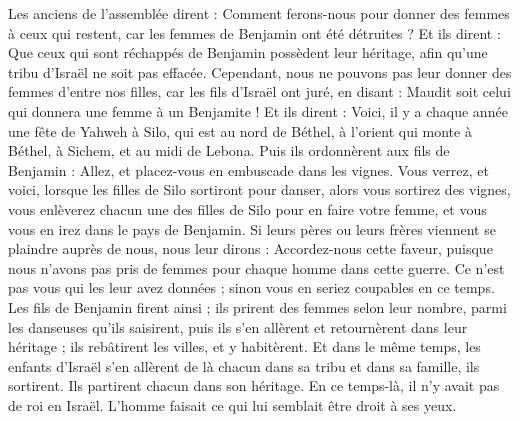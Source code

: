 \begin{multicols}{2}
Les anciens de l'assemblée dirent : Comment ferons-nous pour donner des femmes à ceux qui restent, car les femmes de Benjamin ont été détruites ?
Et ils dirent : Que ceux qui sont réchappés de Benjamin possèdent leur héritage, afin qu'une tribu d'Israël ne soit pas effacée.
Cependant, nous ne pouvons pas leur donner des femmes d'entre nos filles, car les fils d'Israël ont juré, en disant : Maudit soit celui qui donnera une femme à un Benjamite !
Et ils dirent : Voici, il y a chaque année une fête de Yahweh à Silo, qui est au nord de Béthel, à l'orient qui monte à Béthel, à Sichem, et au midi de Lebona.
Puis ils ordonnèrent aux fils de Benjamin : Allez, et placez-vous en embuscade dans les vignes.
Vous verrez, et voici, lorsque les filles de Silo sortiront pour danser, alors vous sortirez des vignes, vous enlèverez chacun une des filles de Silo pour en faire votre femme, et vous vous en irez dans le pays de Benjamin.
Si leurs pères ou leurs frères viennent se plaindre auprès de nous, nous leur dirons : Accordez-nous cette faveur, puisque nous n'avons pas pris de femmes pour chaque homme dans cette guerre.  Ce n'est pas vous qui les leur avez données ; sinon vous en seriez coupables en ce temps.
Les fils de Benjamin firent ainsi ; ils prirent des femmes selon leur nombre, parmi les danseuses qu'ils saisirent, puis ils s'en allèrent et retournèrent dans leur héritage ; ils rebâtirent les villes, et y habitèrent.
Et dans le même temps, les enfants d'Israël s'en allèrent de là chacun dans sa tribu et dans sa famille, ils sortirent. Ils partirent chacun dans son héritage.
En ce temps-là, il n'y avait pas de roi en Israël. L'homme faisait ce qui lui semblait être droit à ses yeux.
\PPE{}
\end{multicols}
